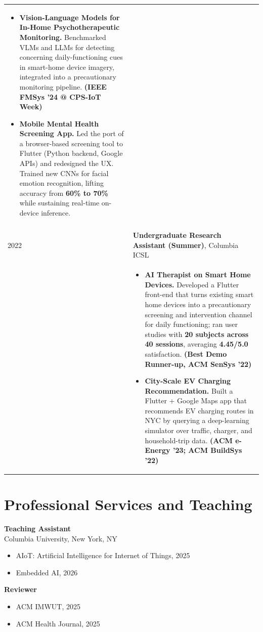 \documentclass{article}
\begin{document}
\begin{longtable}{@{}p{1in}p{5in}}
\begin{itemize}[leftmargin=*, nosep]
                   \item[-] \textbf{Vision-Language Models for In-Home Psychotherapeutic Monitoring.} Benchmarked VLMs and LLMs for detecting concerning daily-functioning cues in smart-home device imagery, integrated into a precautionary monitoring pipeline. \textbf{(IEEE FMSys '24 @ CPS-IoT Week)}
                   \item[-] \textbf{Mobile Mental Health Screening App.} Led the port of a browser-based screening tool to Flutter (Python backend, Google APIs) and redesigned the UX. Trained new CNNs for facial emotion recognition, lifting accuracy from \textbf{60\% to 70\%} while sustaining real-time on-device inference.
                 \end{itemize} \\
               \\
2022           & \textbf{Undergraduate Research Assistant (Summer)}, Columbia ICSL \\
               & \begin{itemize}[leftmargin=*, nosep]
                   \item[-] \textbf{AI Therapist on Smart Home Devices.} Developed a Flutter front-end that turns existing smart home devices into a precautionary screening and intervention channel for daily functioning; ran user studies with \textbf{20 subjects across 40 sessions}, averaging \textbf{4.45/5.0} satisfaction. \textbf{(Best Demo Runner-up, ACM SenSys '22)}
                   \item[-] \textbf{City-Scale EV Charging Recommendation.} Built a Flutter + Google Maps app that recommends EV charging routes in NYC by querying a deep-learning simulator over traffic, charger, and household-trip data. \textbf{(ACM e-Energy '23; ACM BuildSys '22)}
                 \end{itemize} \\
\end{longtable}

\section*{Professional Services and Teaching}

\noindent
\textbf{Teaching Assistant} \\
Columbia University, New York, NY
\begin{itemize}[leftmargin=*, nosep]
    \item[-] AIoT: Artificial Intelligence for Internet of Things, 2025
    \item[-] Embedded AI, 2026
\end{itemize}

\noindent
\textbf{Reviewer}
\begin{itemize}[leftmargin=*, nosep]
    \item[-] ACM IMWUT, 2025
    \item[-] ACM Health Journal, 2025
\end{itemize}
\end{document}
